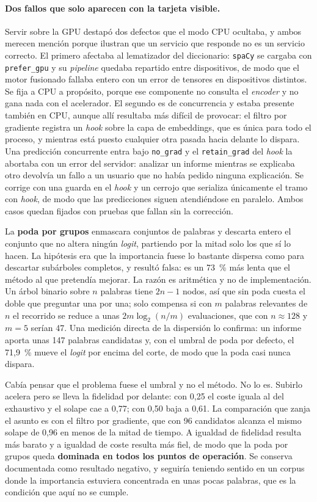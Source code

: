 \paragraph{Dos fallos que solo aparecen con la tarjeta visible.}
Servir sobre la GPU destapó dos defectos que el modo CPU ocultaba, y ambos merecen mención porque ilustran que un servicio que responde no es un servicio correcto. El primero afectaba al lematizador del diccionario: \texttt{spaCy} se cargaba con \texttt{prefer\_gpu} y su \emph{pipeline} quedaba repartido entre dispositivos, de modo que el motor fusionado fallaba entero con un error de tensores en dispositivos distintos. Se fija a CPU a propósito, porque ese componente no consulta el \emph{encoder} y no gana nada con el acelerador. El segundo es de concurrencia y estaba presente también en CPU, aunque allí resultaba más difícil de provocar: el filtro por gradiente registra un \emph{hook} sobre la capa de embeddings, que es única para todo el proceso, y mientras está puesto cualquier otra pasada hacia delante lo dispara. Una predicción concurrente entra bajo \texttt{no\_grad} y el \texttt{retain\_grad} del \emph{hook} la abortaba con un error del servidor: analizar un informe mientras se explicaba otro devolvía un fallo a un usuario que no había pedido ninguna explicación. Se corrige con una guarda en el \emph{hook} y un cerrojo que serializa únicamente el tramo con \emph{hook}, de modo que las predicciones siguen atendiéndose en paralelo. Ambos casos quedan fijados con pruebas que fallan sin la corrección.

La \textbf{poda por grupos} enmascara conjuntos de palabras y descarta entero el conjunto que no altera ningún \emph{logit}, partiendo por la mitad solo los que sí lo hacen. La hipótesis era que la importancia fuese lo bastante dispersa como para descartar subárboles completos, y resultó falsa: es un 73~\% más lenta que el método al que pretendía mejorar. La razón es aritmética y no de implementación. Un árbol binario sobre $n$ palabras tiene $2n-1$ nodos, así que sin poda cuesta el doble que preguntar una por una; solo compensa si con $m$ palabras relevantes de $n$ el recorrido se reduce a unas $2m\log_2(n/m)$ evaluaciones, que con $n \approx 128$ y $m = 5$ serían 47. Una medición directa de la dispersión lo confirma: un informe aporta unas 147 palabras candidatas y, con el umbral de poda por defecto, el 71,9~\% mueve el \emph{logit} por encima del corte, de modo que la poda casi nunca dispara.

Cabía pensar que el problema fuese el umbral y no el método. No lo es. Subirlo acelera pero se lleva la fidelidad por delante: con 0,25 el coste iguala al del exhaustivo y el solape cae a 0,77; con 0,50 baja a 0,61. La comparación que zanja el asunto es con el filtro por gradiente, que con 96 candidatos alcanza el mismo solape de 0,96 en menos de la mitad de tiempo. A igualdad de fidelidad resulta más barato y a igualdad de coste resulta más fiel, de modo que la poda por grupos queda \textbf{dominada en todos los puntos de operación}. Se conserva documentada como resultado negativo, y seguiría teniendo sentido en un corpus donde la importancia estuviera concentrada en unas pocas palabras, que es la condición que aquí no se cumple.

